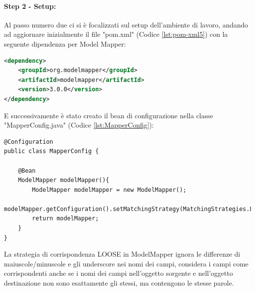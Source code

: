 \paragraph{Step 2 - Setup:}
Al passo numero due ci si è focalizzati sul setup dell’ambiente di lavoro, andando ad aggiornare inizialmente il file "pom.xml" (Codice \vref{lst:pom-xml5}) con la seguente dipendenza per Model Mapper:
\begin{lstlisting}[language=XML, caption={Aggiornamento dipendenze nel pom.xml per includere model-mapper}, label=lst:pom-xml5]
<dependency>
    <groupId>org.modelmapper</groupId>
    <artifactId>modelmapper</artifactId>
    <version>3.0.0</version>
</dependency>
\end{lstlisting}
E successivamente è stato creato il bean di configurazione nella classe "MapperConfig.java" (Codice \vref{lst:MapperConfig}):
\begin{lstlisting}[style=myJava, 
    caption={Classe di configurazione MapperConfig.java}, label=lst:MapperConfig, 
    emph={[2] LOOSE},
    emphstyle={[2]\color{codeDarkMagenta}},]
@Configuration
public class MapperConfig {

    @Bean
    ModelMapper modelMapper(){
        ModelMapper modelMapper = new ModelMapper();
        modelMapper.getConfiguration().setMatchingStrategy(MatchingStrategies.LOOSE);
        return modelMapper;
    }
}
\end{lstlisting}
La strategia di corrispondenza LOOSE in ModelMapper ignora le differenze di maiuscole/minuscole e gli underscore nei nomi dei campi, considera i campi come corrispondenti anche se i nomi dei campi nell’oggetto sorgente e nell’oggetto destinazione non sono esattamente gli stessi, ma contengono le stesse parole.
